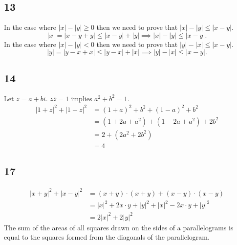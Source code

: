 \documentclass{article}
\begin{document}
\subsection*{13}
In the case where $|x| - |y| \geq 0$ then we need to prove that $|x| - |y| \leq |x-y|$.
\[
    |x| = |x - y + y| \leq |x-y| + |y| \implies |x| - |y| \leq |x-y|.
\]
In the case where $|x| - |y| < 0$ then we need to prove that $|y| - |x| \leq |x-y|$.
\[
    |y| = |y - x + x| \leq |y-x| + |x| \implies |y| - |x| \leq |x-y|.
\]
\subsection*{14}
Let $z = a+bi$. $z\bar{z} = 1$ implies $a^2+b^2 = 1$.
\begin{align*}
    |1+z|^2 + |1-z|^2 &= (1+a)^2 + b^2 +  (1-a)^2 + b^2 \\
    &=(1 + 2a + a^2) +  (1 - 2a + a^2) + 2b^2 \\
    &= 2 + (2a^2 + 2b^2) \\
    &= 4
\end{align*}
\subsection*{17}
\begin{align*}
    |x+y|^2 + |x-y|^2 &= (x+y)\cdot(x+y) + (x-y)\cdot(x-y)\\
    &= |x|^2 + 2x\cdot y + |y|^2 + |x|^2 - 2x\cdot y + |y|^2 \\
    &= 2|x|^2 + 2|y|^2
\end{align*}
The sum of the areas of all squares drawn on the sides of a parallelograms
is equal to the squares formed from the diagonals of the parallelogram.

\newpage
\end{document}
